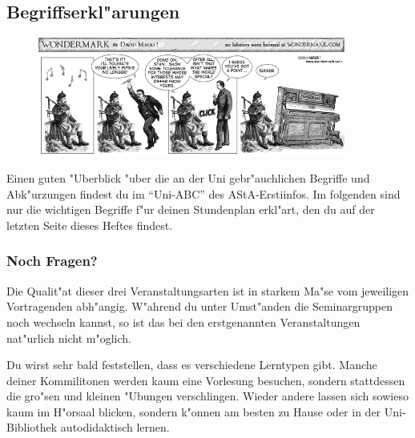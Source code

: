 \subsection{Begriffserkl"arungen}

\begin{figure}[b]
	\centering\includegraphics[width=0.9\textwidth]{bilder/comics/wondermark003.png}
\end{figure}


Einen guten "Uberblick "uber die an der Uni gebr"auchlichen Begriffe und
Abk"urzungen findest du im "`Uni-ABC"' des AStA-Erstiinfos. Im folgenden
sind nur die wichtigen Begriffe f"ur deinen Stundenplan erkl"art, den du
auf der letzten Seite dieses Heftes findest.




\subsubsection*{Noch Fragen?}

Die Qualit"at dieser drei Veranstaltungsarten ist in starkem Ma"se vom
jeweiligen Vortragenden abh"angig. W"ahrend du unter Umst"anden die
Seminargruppen noch wechseln kannst, so ist das bei den erstgenannten
Veranstaltungen nat"urlich nicht m"oglich.

Du wirst sehr bald feststellen, dass es verschiedene Lerntypen gibt. Manche
deiner Kommilitonen werden kaum eine Vorlesung besuchen, sondern stattdessen die gro"sen
und kleinen "Ubungen verschlingen. Wieder andere lassen sich sowieso kaum im
H"orsaal blicken, sondern k"onnen am besten zu Hause oder in der Uni-Bibliothek
autodidaktisch lernen.

